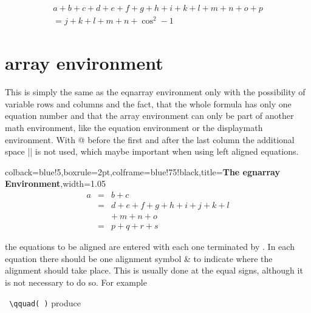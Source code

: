 \begin{multline}
a + b + c + d + e + f+ g + h + i  + k + l + m + n + o + p\\
= j + k + l + m + n +\cos^{2}-1
\end{multline}

\newpage
\section{array environment}
This is simply the same as the eqnarray environment only with the possibility of
variable rows and columns and the fact, that the whole formula has only one
equation number and that the array environment can only be part of another math
environment, like the equation environment or the displaymath environment. With
@{} before the first and after the last column the additional space |\arraycolsep| is
not used, which maybe important when using left aligned equations.

\begin{tcblisting}{colback=blue!5,boxrule=2pt,colframe=blue!75!black,title=\textbf{The egnarray Environment},width=1.05\textwidth}
\begin{eqnarray}
a & = & b + c \\
& = & d + e + f + g + h + i
+ j + k + l \nonumber \\
&& +\: m + n + o \\
& = & p + q + r + s
\end{eqnarray}
\end{tcblisting}



the equations
to be aligned are entered with each one terminated by . In each equation there should be
one alignment symbol \& to indicate where the alignment should take place. This is usually
done at the equal signs, although it is not necessary to do so. For example

\verb*+ \qquad( )+ produce

